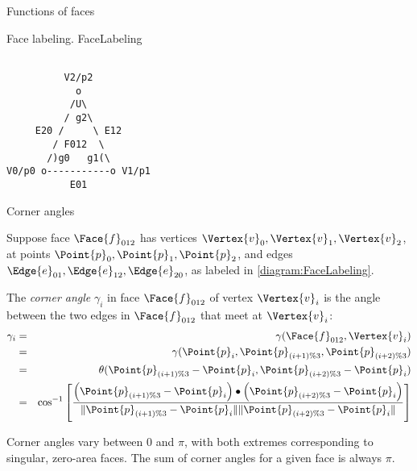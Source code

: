 \begin{plSection}{Functions of faces}
\label{sec:faces}

\begin{plDiagram}
{Face labeling.}
{FaceLabeling}
\centering
\begin{verbatim}

          V2/p2
            o
           /U\
          / g2\
     E20 /     \ E12
        / F012  \
       /)g0   g1(\
V0/p0 o-----------o V1/p1
           E01
\end{verbatim}
\end{plDiagram}

\begin{plSection}{Corner angles}
\label{sec:corner_angles}

Suppose face $\Face{f}_{012}$ has vertices $\Vertex{v}_0, \Vertex{v}_1, \Vertex{v}_2$,
at points $\Point{p}_0, \Point{p}_1, \Point{p}_2$,
and edges $\Edge{e}_{01}, \Edge{e}_{12}, \Edge{e}_{20}$,
as labeled in \cref{diagram:FaceLabeling}.

The {\em corner angle} $\gamma_i$ in face $\Face{f}_{012}$ of vertex $\Vertex{v}_i$ is
the angle between the two edges in $\Face{f}_{012}$ that meet at $\Vertex{v}_i$:
\begin{eqnarray}
\gamma_i
& = & \gamma(\Face{f}_{012},\Vertex{v}_i)
\\
& = & \gamma(\Point{p}_i,\Point{p}_{(i+1) \% 3},\Point{p}_{(i+2) \% 3})
\nonumber
\\
& = & \theta(\Point{p}_{(i+1) \% 3} - \Point{p}_i,\Point{p}_{(i+2) \% 3} - \Point{p}_i)
\nonumber
\\
& = &
\cos^{-1}
\left[
\frac{ \left( \Point{p}_{(i+1) \% 3} - \Point{p}_i \right)
  \bullet
  \left( \Point{p}_{(i+2) \% 3} - \Point{p}_i \right) }
{ \| \Point{p}_{(i+1) \% 3} - \Point{p}_i \|
  \| \Point{p}_{(i+2) \% 3} - \Point{p}_i \| }
\right]
\nonumber
\end{eqnarray}

Corner angles vary between $0$ and $\pi$, with both extremes
corresponding to singular, zero-area faces.
The sum of corner angles for a given face is always $\pi$.


\end{plSection}
\end{plSection}
